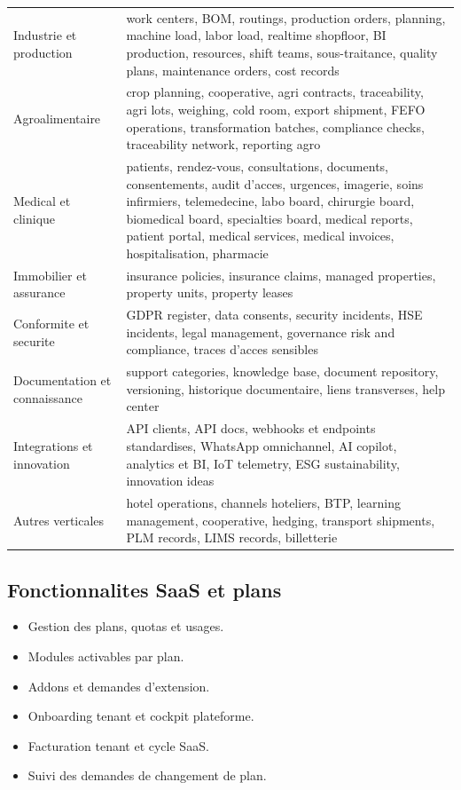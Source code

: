 \documentclass[11pt,a4paper]{article}
\begin{document}
\begin{longtable}{p{3.6cm}p{9.8cm}}
Industrie et production & work centers, BOM, routings, production orders, planning, machine load, labor load, realtime shopfloor, BI production, resources, shift teams, sous-traitance, quality plans, maintenance orders, cost records \\
Agroalimentaire & crop planning, cooperative, agri contracts, traceability, agri lots, weighing, cold room, export shipment, FEFO operations, transformation batches, compliance checks, traceability network, reporting agro \\
Medical et clinique & patients, rendez-vous, consultations, documents, consentements, audit d'acces, urgences, imagerie, soins infirmiers, telemedecine, labo board, chirurgie board, biomedical board, specialties board, medical reports, patient portal, medical services, medical invoices, hospitalisation, pharmacie \\
Immobilier et assurance & insurance policies, insurance claims, managed properties, property units, property leases \\
Conformite et securite & GDPR register, data consents, security incidents, HSE incidents, legal management, governance risk and compliance, traces d'acces sensibles \\
Documentation et connaissance & support categories, knowledge base, document repository, versioning, historique documentaire, liens transverses, help center \\
Integrations et innovation & API clients, API docs, webhooks et endpoints standardises, WhatsApp omnichannel, AI copilot, analytics et BI, IoT telemetry, ESG sustainability, innovation ideas \\
Autres verticales & hotel operations, channels hoteliers, BTP, learning management, cooperative, hedging, transport shipments, PLM records, LIMS records, billetterie \\
\bottomrule
\end{longtable}

\subsection{Fonctionnalites SaaS et plans}
\begin{itemize}[leftmargin=1.2cm]
    \item Gestion des plans, quotas et usages.
    \item Modules activables par plan.
    \item Addons et demandes d'extension.
    \item Onboarding tenant et cockpit plateforme.
    \item Facturation tenant et cycle SaaS.
    \item Suivi des demandes de changement de plan.
\end{itemize}
\end{document}
